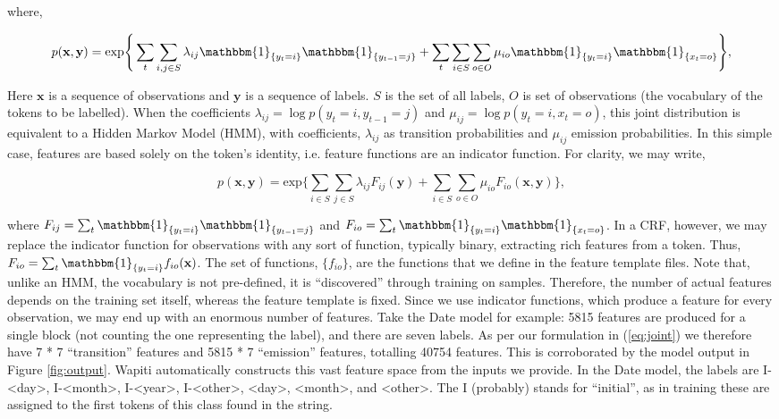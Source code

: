 \documentclass[11pt, oneside]{scrartcl}   	%
\begin{document}
where, 

\begin{equation}
p(\textbf{x}, \textbf{y}) = \text{exp} \Bigg\{\sum_t{
\sum_{i, j \in S}{
\lambda_{ij}\mathbbm{1}_{\{y_t = i\}}\mathbbm{1}_{\{y_{t-1} = j\}}
}
+ \sum_t\sum_{i \in S}\sum_{o \in O}{
\mu_{io}\mathbbm{1}_{\{y_t = i\}}\mathbbm{1}_{\{x_t = o\}}
}
}\Bigg\},
\label{eq:joint}
\end{equation}

Here $\textbf{x}$ is a sequence of observations and $\textbf{y}$ is a sequence of labels. $S$ is the set of all labels, $O$ is set of observations (the vocabulary of the tokens to be labelled). When the coefficients $\lambda_{ij} = \log p(y_t=i, y_{t - 1}=j)$ and $\mu_{ij} = \log p(y_t=i,x_t=o)$, this joint distribution is equivalent to a Hidden Markov Model (HMM), with coefficients, $\lambda_{ij}$ as transition probabilities and $\mu_{ij}$ emission probabilities. In this simple case, features are based solely on the token's identity, i.e. feature functions are an indicator function. For clarity, we may write,

\begin{equation}
p(\textbf{x}, \textbf{y}) = \text{exp} \Bigg\{
\sum_{i \in S}
\sum_{j \in S}
\lambda_{ij}
F_{ij}(\textbf{y})
+ 
\sum_{i \in S}
\sum_{o \in O}
\mu_{io}
F_{io}(\textbf{x}, \textbf{y})
\Bigg\},
\label{eq:joint}
\end{equation}

where $F_{ij} = \sum_t\mathbbm{1}_{\{y_t = i\}}\mathbbm{1}_{\{y_{t-1} = j\}}$ and $F_{io} = \sum_t\mathbbm{1}_{\{y_t = i\}}\mathbbm{1}_{\{x_t = o\}}$. In a CRF, however, we may replace the indicator function for observations with any sort of function, typically binary, extracting rich features from a token. Thus, $F_{io} = \sum_t\mathbbm{1}_{\{y_t = i\}}f_{io}(\textbf{x})$. The set of functions, $\{f_{io}\}$, are the functions that we define in the feature template files. Note that, unlike an HMM, the vocabulary is not pre-defined, it is ``discovered'' through training on samples. Therefore, the number of actual features depends on the training set itself, whereas the feature template is fixed. Since we use indicator functions, which produce a feature for every observation, we may end up with an enormous number of features. Take the Date model for example: 5815 features are produced for a single block (not counting the one representing the label), and there are seven labels. As per our formulation in (\ref{eq:joint}) we therefore have 7 * 7 ``transition'' features and 5815 * 7 ``emission'' features, totalling 40754 features. This is corroborated by the model output in Figure \ref{fig:output}. Wapiti automatically constructs this vast feature space from the inputs we provide. In the Date model, the labels are I-<day>, I-<month>, I-<year>, I-<other>, <day>, <month>, and <other>. The I (probably) stands for ``initial'', as in training these are assigned to the first tokens of this class found in the string.
\end{document}
